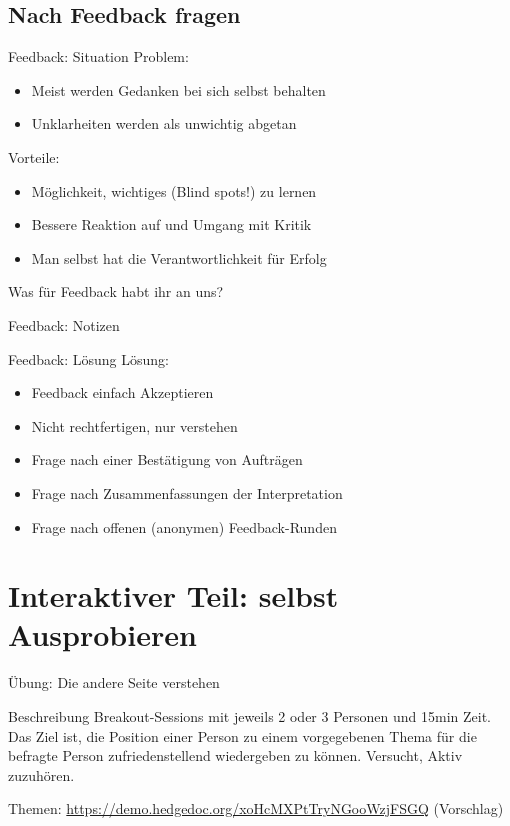 \subsection{Nach Feedback fragen}

\begin{frame}[c]{Feedback: Situation}
    \large
    Problem:
    \begin{itemize}[<+(1)->]
        \item Meist werden Gedanken bei sich selbst behalten
        \item Unklarheiten werden als unwichtig abgetan
    \end{itemize}
    \pause
    Vorteile:
    \begin{itemize}[<+(1)->]
        \item Möglichkeit, wichtiges (Blind spots!) zu lernen
        \item Bessere Reaktion auf und Umgang mit Kritik
        \item Man selbst hat die Verantwortlichkeit für Erfolg
    \end{itemize}
\end{frame}

\begin{frame}[standout]
    Was für Feedback habt ihr an uns?
\end{frame}

\begin{frame}[c]{Feedback: Notizen}
    
\end{frame}

\begin{frame}[c]{Feedback: Lösung}    
    \large
    Lösung:
    \begin{itemize}[<+(1)->]
        \item Feedback einfach Akzeptieren
        \item Nicht rechtfertigen, nur verstehen
        \item Frage nach einer Bestätigung von Aufträgen
        \item Frage nach Zusammenfassungen der Interpretation
        \item Frage nach offenen (anonymen) Feedback-Runden
    \end{itemize}
\end{frame}





\section{Interaktiver Teil: selbst Ausprobieren}

\begin{frame}[c]{Übung: Die andere Seite verstehen}
    \large
    \begin{block}{Beschreibung}
    Breakout-Sessions mit jeweils 2 oder 3 Personen und 15min Zeit.
    Das Ziel ist, die Position einer Person zu einem vorgegebenen Thema
    für die befragte Person zufriedenstellend wiedergeben zu können.
    Versucht, Aktiv zuzuhören.
    \end{block}
    Themen: \url{https://demo.hedgedoc.org/xoHcMXPtTryNGooWzjFSGQ} (Vorschlag)
\end{frame}
